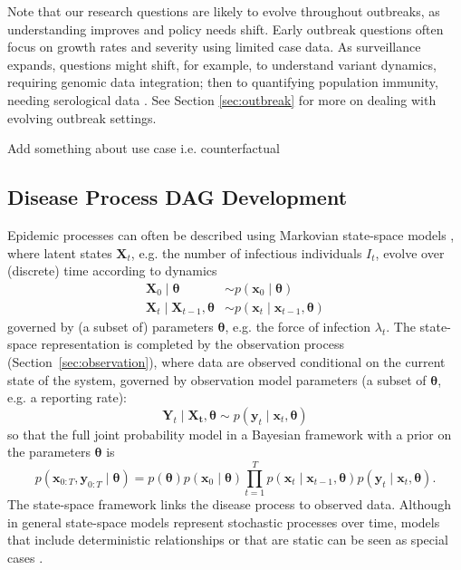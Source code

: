\documentclass{article}
\begin{document}
Note that our research questions are likely to evolve throughout outbreaks, as understanding improves and policy needs shift. Early outbreak questions often focus on growth rates and severity using limited case data. As surveillance expands, questions might shift, for example, to understand variant dynamics, requiring genomic data integration; then to quantifying population immunity, needing serological data \citep{bhatia2023lessons,shearer2024opportunities}. See Section \ref{sec:outbreak} for more on dealing with evolving outbreak settings.

Add something about use case i.e. counterfactual

\subsection{Disease Process DAG Development} \label{sec:process}

Epidemic processes can often be described using Markovian state-space models \citep{birrell2018evidence}, where latent states $\boldsymbol{X}_t$, e.g. the number of infectious individuals $I_t$, evolve over (discrete) time according to dynamics 
\begin{align*}
\boldsymbol{X}_{0} \mid \boldsymbol{\theta} & \sim p(\boldsymbol{x}_0 \mid \boldsymbol{\theta}) \\
\boldsymbol{X}_{t} \mid \boldsymbol{X}_{t-1}, \boldsymbol{\theta} & \sim p(\boldsymbol{x}_t \mid \boldsymbol{x}_{t-1}, \boldsymbol{\theta})
\end{align*}
governed by (a subset of) parameters $\boldsymbol{\theta}$, e.g. the force of infection $\lambda_t$. The state-space representation is completed by the observation process (Section~\ref{sec:observation}), where data are observed conditional on the current state of the system, governed by observation model parameters (a subset of $\boldsymbol{\theta}$, e.g. a reporting rate):
$$
\boldsymbol{Y}_{t} \mid \boldsymbol{X_t}, \boldsymbol{\theta} \sim p(\boldsymbol{y}_t \mid \boldsymbol{x}_t, \boldsymbol{\theta}) 
$$
so that the full joint probability model in a Bayesian framework with a prior on the parameters $\boldsymbol{\theta}$ is
$$
p(\boldsymbol{x}_{0:T}, \boldsymbol{y}_{0:T} \mid \boldsymbol{\theta}) = p(\boldsymbol{\theta})p(\boldsymbol{x}_0 \mid \boldsymbol{\theta})\prod_{t=1}^T p(\boldsymbol{x}_t \mid \boldsymbol{x}_{t-1}, \boldsymbol{\theta})p(\boldsymbol{y}_t \mid \boldsymbol{x}_t, \boldsymbol{\theta}).
$$
The state-space framework links the disease process to observed data. Although in general state-space models represent stochastic processes over time, models that include deterministic relationships or that are static can be seen as special cases \citep{birrell2018evidence}. 
\end{document}
